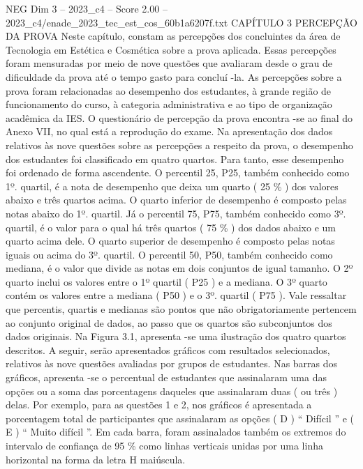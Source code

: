 \begin{textsample}{NEG Dim 3 – 2023\_c4 – Score 2.00 – 2023\_c4/enade\_2023\_tec\_est\_cos\_60b1a6207f.txt}  \label{ex:f3_neg_205}
CAPÍTULO 3 PERCEPÇÃO DA PROVA Neste capítulo, constam as percepções dos concluintes da área de Tecnologia em Estética e Cosmética sobre a prova aplicada.
Essas percepções foram mensuradas por meio de nove questões que avaliaram desde o grau de dificuldade da prova até o tempo gasto para concluí -la.
As percepções sobre a prova foram relacionadas ao desempenho dos estudantes, à grande região de funcionamento do curso, à categoria administrativa e ao tipo de organização acadêmica da IES.
O questionário de percepção da prova encontra -se ao final do Anexo VII, no qual está a reprodução do exame.
Na apresentação dos dados relativos às nove questões sobre as percepções a respeito da prova, o desempenho dos estudantes foi classificado em quatro quartos.
Para tanto, esse desempenho foi ordenado de forma ascendente.
O percentil 25, P25, também conhecido como 1º. quartil, é a nota de desempenho que deixa um quarto ( 25 \% ) dos valores abaixo e três quartos acima.
O quarto inferior de desempenho é composto pelas notas abaixo do 1º. quartil.
Já o percentil 75, P75, também conhecido como 3º. quartil, é o valor para o qual há três quartos ( 75 \% ) dos dados abaixo e um quarto acima dele.
O quarto superior de desempenho é composto pelas notas iguais ou acima do 3º. quartil.
O percentil 50, P50, também conhecido como mediana, é o valor que divide as notas em dois conjuntos de igual tamanho.
O 2º quarto inclui os valores entre o 1º quartil ( P25 ) e a mediana.
O 3º quarto contém os valores entre a mediana ( P50 ) e o 3º. quartil ( P75 ).
Vale ressaltar que percentis, quartis e medianas são pontos que não obrigatoriamente pertencem ao conjunto original de dados, ao passo que os quartos são subconjuntos dos dados originais.
Na Figura 3.1, apresenta -se uma ilustração dos quatro quartos descritos.
A seguir, serão apresentados gráficos com resultados selecionados, relativos às nove questões avaliadas por grupos de estudantes.
Nas barras dos gráficos, apresenta -se o percentual de estudantes que assinalaram uma das opções ou a soma das porcentagens daqueles que assinalaram duas ( ou três ) delas.
Por exemplo, para as questões 1 e 2, nos gráficos é apresentada a porcentagem total de participantes que assinalaram as opções ( D ) “ Difícil ” e ( E ) “ Muito difícil ”.
Em cada barra, foram assinalados também os extremos do intervalo de confiança de 95 \% como linhas verticais unidas por uma linha horizontal na forma da letra H maiúscula.

\end{textsample}
